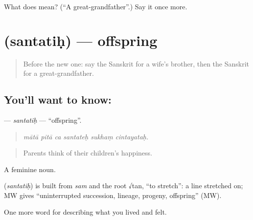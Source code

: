 \begin{tcolorbox}[breakable,colback=teal!4,colframe=teal!35!black,title={Before you move on}]
What does  mean? (\textquotedblleft{}A great-grandfather\textquotedblright{}.) Say it once more.
\end{tcolorbox}
\section[\texorpdfstring{\sk{सन्ततिः} (santatiḥ)}{सन्ततिः (santatiḥ)}]{ (santatiḥ) — offspring}

\label{lesson:SA-C500-santatih}



\begin{quote}
Before the new one: say the Sanskrit for a wife's brother, then the Sanskrit for a great-grandfather.
\end{quote}

\subsection*{You'll want to know: }
\textbf{} — \emph{santatiḥ} — \textquotedblleft{}offspring\textquotedblright{}.

\begin{quote}
     
\end{quote}

\begin{quote}
\emph{mātā pitā ca santateḥ sukhaṃ cintayataḥ.}
\end{quote}

\begin{quote}
Parents think of their children's happiness.
\end{quote}

A feminine noun.

\begin{cousinweb}
\textbf{} (\emph{santatiḥ}) is built from \emph{sam} and the root √tan, \textquotedblleft{}to stretch\textquotedblright{}: a line stretched on; MW gives \textquotedblleft{}uninterrupted succession, lineage, progeny, offspring\textquotedblright{} (MW).
\end{cousinweb}

\begin{grammarlens}[title={What you've built}]
One more word for describing what you lived and felt.
\end{grammarlens}

